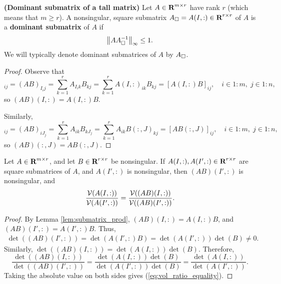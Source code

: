 \documentclass{article}
\begin{document}
	\begin{dfn} \textnormal{\bf(Dominant submatrix of a tall matrix)}
		\label{def:dominant_submatrix}
		Let $A \in \textnormal{\bf R}^{m\times r}$ have rank $r$ (which means that $m \ge r$). A nonsingular, square submatrix $A_\square = A(I,:) \in \textnormal{\bf R}^{r\times r}$ of $A$ is a \textbf{dominant submatrix} of $A$ if
		\begin{equation}
			\left\lVert AA_{\square}^{-1} \right\rVert_\infty \le 1.
		\end{equation}
		We will typically denote dominant submatrices of $A$ by $A_\square$.
	\end{dfn}
	
	\begin{proof}
		Observe that
		\begin{equation}
			[(AB)(I,:)]_{ij} = (AB)_{I_ij} = \sum_{k=1}^rA_{I_ik}B_{kj} = \sum_{k=1}^rA(I,:)_{ik}B_{kj} = [A(I,:)B]_{ij}, \quad i\in 1:m,\; j\in 1:n,
		\end{equation}
		so $(AB)(I,:) = A(I,:)B$.
		
		Similarly,
		\begin{equation}
			[(AB)(:,J)]_{ij} = (AB)_{iJ_j} = \sum_{k=1}^rA_{ik}B_{kJ_j} = \sum_{k=1}^rA_{ik}B(:,J)_{kj} = [AB(:,J)]_{ij}, \quad i\in 1:m,\; j\in 1:n,
		\end{equation}
		so $(AB)(:,J) = AB(:,J)$.
	\end{proof}
	
	\begin{lem}
		\label{lem:submatrix_volume_and_matrix_multiplication}
		Let $A \in \textnormal{\bf R}^{m\times r}$, and let $B \in \textnormal{\bf R}^{r\times r}$ be nonsingular. If $A(I,:), A(I',:)\in \textnormal{\bf R}^{r\times r}$ are square submatrices of $A$, and $A(I',:)$ is nonsingular, then $(AB)(I',:)$ is nonsingular, and
		\begin{equation}
			\label{eq:vol_ratio_equality}
			\frac{\mathcal{V}(A(I,:))}{\mathcal{V}(A(I',:))} = \frac{\mathcal{V}((AB)(I,:))}{\mathcal{V}((AB)(I',:))}.
		\end{equation}
	\end{lem}
	
	\begin{proof} 
		By Lemma \ref{lem:submatrix_prod}, $(AB)(I,:) = A(I,:)B$, and $(AB)(I',:) = A(I',:)B$. Thus, 
		\begin{align}
			\det((AB)(I',:)) = \det(A(I',:)B) = \det(A(I',:))\det(B) \ne 0.
		\end{align}
		Similarly, $\det((AB)(I,:)) = \det(A(I,:))\det(B)$. Therefore,
		\begin{equation}
			\frac{\det((AB)(I,:))}{\det((AB)(I',:))} = \frac{\det(A(I,:))\det(B)}{\det(A(I',:))\det(B)} = \frac{\det(A(I,:))}{\det(A(I',:))}.
		\end{equation}
		Taking the absolute value on both sides gives (\ref{eq:vol_ratio_equality}).
	\end{proof}
	
\end{document}
